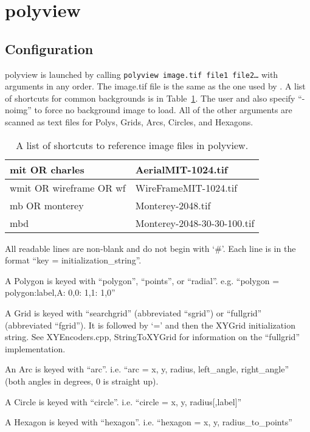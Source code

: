 \section{polyview}
\label{polyview}

\subsection{Configuration}
polyview is launched by calling {\tt polyview image.tif file1 file2\ldots} with arguments in any order.  The image.tif file is the same as the one used by \pmv.  A list of shortcuts for common backgrounds is in Table~\ref{tab:polyviewargs}.  The user and also specify ``-noimg'' to force no background image to load.  All of the other arguments are scanned as text files for Polys, Grids, Arcs, Circles, and Hexagons.

\begin{table}
\renewcommand{\arraystretch}{1.3}
\caption{A list of shortcuts to reference image files in polyview.}
\label{tab:polyviewargs}
\centering
\begin{tabular}{l|l}
\hline
mit OR charles & AerialMIT-1024.tif \\
\hline
wmit OR wireframe OR wf & WireFrameMIT-1024.tif \\
\hline
mb OR monterey & Monterey-2048.tif \\
\hline
mbd & Monterey-2048-30-30-100.tif \\
\hline
\end{tabular}
\end{table}

All readable lines are non-blank and do not begin with `\#'.  Each line is in the format ``key = initialization\_string''.

A Polygon is keyed with ``polygon'', ``points'', or ``radial''.  e.g. ``polygon = polygon:label,A: 0,0: 1,1: 1,0''

A Grid is keyed with ``searchgrid'' (abbreviated ``sgrid'') or ``fullgrid'' (abbreviated ``fgrid'').  It is followed by `=' and then the XYGrid initialization string.  See XYEncoders.cpp, StringToXYGrid for information on the ``fullgrid'' implementation.

An Arc is keyed with ``arc''.  i.e. ``arc = x, y, radius, left\_angle, right\_angle'' (both angles in degrees, 0 is straight up).

A Circle is keyed with ``circle''. i.e. ``circle = x, y, radius[,label]''

A Hexagon is keyed with ``hexagon''. i.e. ``hexagon = x, y, radius\_to\_points''


